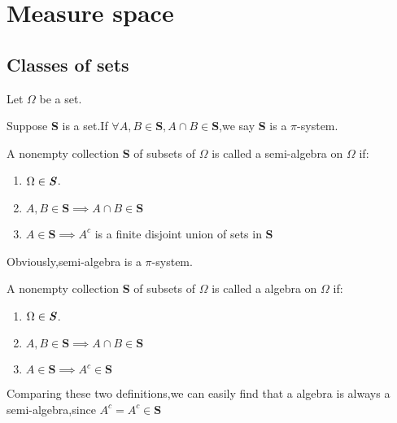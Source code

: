 \section{Measure space}

\subsection{Classes of sets}

Let \textbf{\textit{$\Omega$}} be a set.
\begin{definition}[$\pi$-system]
    Suppose \textbf{S} is a set.If $\forall A,B \in \textbf{S},A\cap B \in \textbf{S}$,we say \textbf{S} is a $\pi$-system.  
\end{definition}
   
\begin{definition}\label{def:semi-algebra}
    A nonempty collection  \textbf{S} of subsets of $\Omega$ is called a semi-algebra on $\Omega$ if:\smallskip
    \begin{enumerate}
        \item $\Omega \in \textbf{\textit{S}}$.
        \item $A , B \in \textbf{S} \implies A \cap B \in \textbf{S} $
        \item $A \in \textbf{S} \implies A^c$ is a finite disjoint union of sets in \textbf{S}
    \end{enumerate}

    Obviously,semi-algebra  is a $\pi$-system.

\end{definition}

\begin{definition}[Algebra]\label{def:algebra}
    A nonempty collection  \textbf{S} of subsets of $\Omega$ is called a algebra on $\Omega$ if:\smallskip
    \begin{enumerate}
        \item $\Omega \in \textbf{\textit{S}}$.
        \item $A , B \in \textbf{S} \implies A \cap B \in \textbf{S} $
        \item $A \in \textbf{S} \implies A^c \in \textbf{S}$ 
    \end{enumerate}
\end{definition}

Comparing these two definitions,we can easily find that a algebra is always a semi-algebra,since $A^c = A^c \in \textbf{S}$

